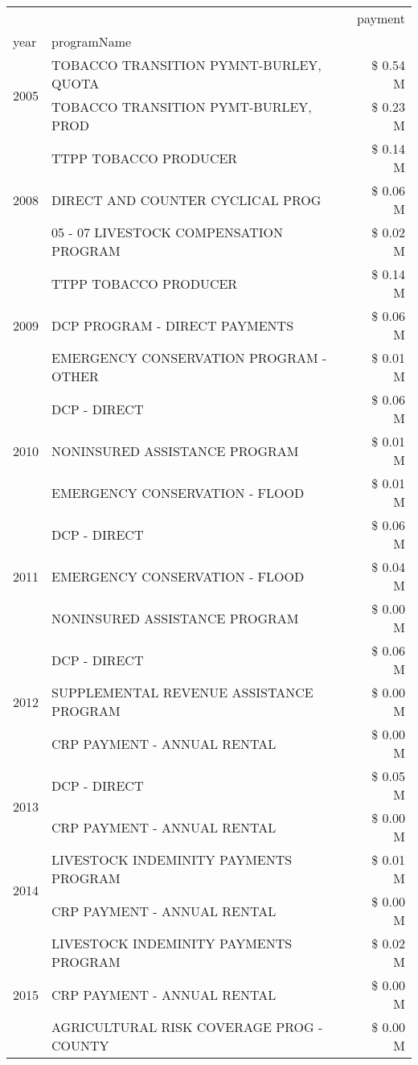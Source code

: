 \begin{tabular}{llr}
\toprule
 &  & payment \\
year & programName &  \\
\midrule
\multirow[t]{2}{*}{2005} & TOBACCO TRANSITION PYMNT-BURLEY, QUOTA & \$ 0.54 M \\
 & TOBACCO TRANSITION PYMT-BURLEY, PROD & \$ 0.23 M \\
\cline{1-3}
\multirow[t]{3}{*}{2008} & TTPP TOBACCO PRODUCER & \$ 0.14 M \\
 & DIRECT AND COUNTER CYCLICAL PROG & \$ 0.06 M \\
 & 05 - 07 LIVESTOCK COMPENSATION PROGRAM & \$ 0.02 M \\
\cline{1-3}
\multirow[t]{3}{*}{2009} & TTPP TOBACCO PRODUCER & \$ 0.14 M \\
 & DCP PROGRAM - DIRECT PAYMENTS & \$ 0.06 M \\
 & EMERGENCY CONSERVATION PROGRAM - OTHER & \$ 0.01 M \\
\cline{1-3}
\multirow[t]{3}{*}{2010} & DCP - DIRECT & \$ 0.06 M \\
 & NONINSURED ASSISTANCE PROGRAM & \$ 0.01 M \\
 & EMERGENCY CONSERVATION - FLOOD & \$ 0.01 M \\
\cline{1-3}
\multirow[t]{3}{*}{2011} & DCP - DIRECT & \$ 0.06 M \\
 & EMERGENCY CONSERVATION - FLOOD & \$ 0.04 M \\
 & NONINSURED ASSISTANCE PROGRAM & \$ 0.00 M \\
\cline{1-3}
\multirow[t]{3}{*}{2012} & DCP - DIRECT & \$ 0.06 M \\
 & SUPPLEMENTAL REVENUE ASSISTANCE PROGRAM & \$ 0.00 M \\
 & CRP PAYMENT - ANNUAL RENTAL & \$ 0.00 M \\
\cline{1-3}
\multirow[t]{2}{*}{2013} & DCP - DIRECT & \$ 0.05 M \\
 & CRP PAYMENT - ANNUAL RENTAL & \$ 0.00 M \\
\cline{1-3}
\multirow[t]{2}{*}{2014} & LIVESTOCK INDEMINITY PAYMENTS PROGRAM & \$ 0.01 M \\
 & CRP PAYMENT - ANNUAL RENTAL & \$ 0.00 M \\
\cline{1-3}
\multirow[t]{3}{*}{2015} & LIVESTOCK INDEMINITY PAYMENTS PROGRAM & \$ 0.02 M \\
 & CRP PAYMENT - ANNUAL RENTAL & \$ 0.00 M \\
 & AGRICULTURAL RISK COVERAGE PROG - COUNTY & \$ 0.00 M \\

\end{tabular}
